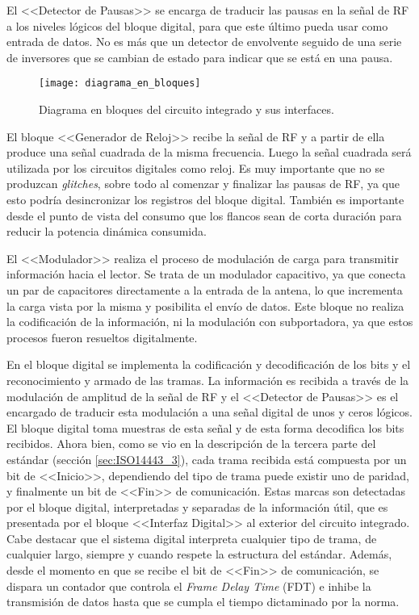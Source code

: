 El <<Detector de Pausas>> se encarga de traducir las pausas en la señal de 
RF a los niveles lógicos del bloque digital, para que este último pueda usar 
como entrada de datos. No es más que un detector de envolvente seguido de 
una serie de inversores que se cambian de estado para indicar que se está en 
una pausa.

\begin{figure}
	\centering
	\texttt{[image: diagrama\_en\_bloques]}
	\caption{Diagrama en bloques del circuito integrado y sus interfaces.}
	\label{fig:DiagramaEnBloquesCI}
\end{figure}

El bloque <<Generador de Reloj>> recibe la señal de RF y a partir de ella 
produce una señal cuadrada de la misma frecuencia. Luego la señal cuadrada 
será utilizada por los circuitos digitales como reloj. Es muy importante que 
no se produzcan \emph{glitches}, sobre todo al comenzar y finalizar las 
pausas de RF, ya que esto podría desincronizar los registros del bloque 
digital. También es importante desde el punto de vista del consumo que los 
flancos sean de corta duración para reducir la potencia dinámica consumida.

El <<Modulador>> realiza el proceso de modulación de carga para transmitir 
información hacia el lector. Se trata de un modulador capacitivo, ya que 
conecta un par de capacitores directamente a la entrada de la antena, lo que 
incrementa la carga vista por la misma y posibilita el envío de datos. Este 
bloque no realiza la codificación de la información, ni la modulación con 
subportadora, ya que estos procesos fueron resueltos digitalmente.

En el bloque digital se implementa la codificación y decodificación de los 
bits y el reconocimiento y armado de las tramas. La información es recibida 
a través de la modulación de amplitud de la señal de RF y el <<Detector de 
Pausas>> es el encargado de traducir esta modulación a una señal digital de 
unos y ceros lógicos. El bloque digital toma muestras de esta señal y de 
esta forma decodifica los bits recibidos. Ahora bien, como se vio en la 
descripción de la tercera parte del estándar (sección \ref{sec:ISO14443_3}), 
cada trama recibida está compuesta por un bit de <<Inicio>>, dependiendo del 
tipo de trama puede existir uno de paridad, y finalmente un bit de <<Fin>> 
de comunicación. Estas marcas son detectadas por el bloque digital, 
interpretadas y separadas de la información útil, que es presentada por el 
bloque <<Interfaz Digital>> al exterior del circuito integrado. Cabe 
destacar que el sistema digital interpreta cualquier tipo de trama, de 
cualquier largo, siempre y cuando respete la estructura del estándar. 
Además, desde el momento en que se recibe el bit de <<Fin>> de comunicación, 
se dispara un contador que controla el \emph{Frame Delay Time} (FDT) e 
inhibe la transmisión de datos hasta que se cumpla el tiempo dictaminado por 
la norma.

